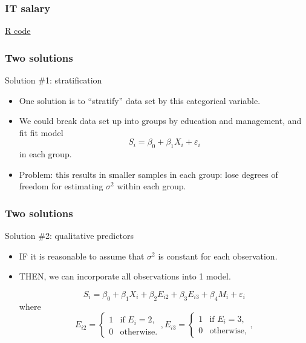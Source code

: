 \documentclass[handout]{beamer}
\begin{document}
   \begin{frame}
   \frametitle{IT salary}
   \begin{center}
   \end{center}
   \href{http://stats191.stanford.edu/interactions.html#salary-example}{R code}
   \end{frame}


   \begin{frame} \frametitle{Two solutions}

   \begin{block}
   {Solution \#1: stratification                     }
   \begin{itemize}[<+->]

   \item One solution is to ``stratify'' data set by this categorical variable.

   \item We could break data set up into groups by education and management, and fit fit model
   $$
   S_i = \beta_0 + \beta_1 X_i + \varepsilon_i$$
   in each group.
   \item Problem: this results in smaller samples in each group: lose degrees of freedom for estimating $\sigma^2$ within each group.

   \end{itemize}

   \end{block}
   \end{frame}


   \begin{frame} \frametitle{Two solutions}

   \begin{block}
   {Solution \#2: qualitative predictors                     }
   \begin{itemize}

   \item IF it is reasonable to assume that $\sigma^2$ is constant
   for each observation.

   \item THEN, we can incorporate all observations into 1 model.

   $$
   S_i = \beta_0 + \beta_1 X_i + \beta_2 E_{i2} + \beta_3 E_{i3} + \beta_4 M_i + \varepsilon_i
   $$
   where
   $$
   E_{i2} = \begin{cases}
   1 & \text{if  $E_i = 2$},\\
   0 & \text{otherwise.}
   \end{cases}, E_{i3} = \begin{cases}
   1 & \text{if  $E_i = 3$},\\
   0 & \text{otherwise,}
   \end{cases},
   $$
   \end{itemize}
   \end{block}
   \end{frame}
\end{document}

